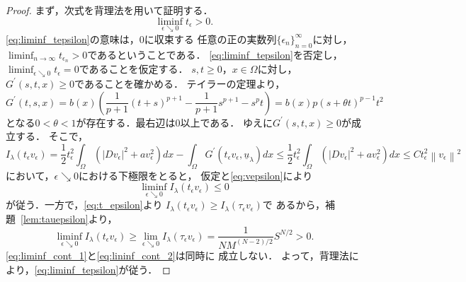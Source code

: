 \begin{proof}
 まず，次式を背理法を用いて証明する．
 \begin{equation}
  \liminf_{\epsilon \searrow 0} t_\epsilon > 0. \label{eq:liminf_tepsilon}
 \end{equation}
 \eqref{eq:liminf_tepsilon}の意味は，$0$に収束する
 任意の正の実数列$\{ \epsilon_n \}_{n=0}^\infty$に対し，
 $\liminf_{n \to \infty} t_{\epsilon_n} > 0$であるということである．
 \eqref{eq:liminf_tepsilon}を否定し，
 $\liminf_{\epsilon \searrow 0} t_\epsilon = 0$であることを仮定する．
 $s, t \geq 0$，$x \in \Omega$に対し，
 $G^\prime(s, t, x) \geq 0$であることを確かめる．
 テイラーの定理より，
 \[
  G^\prime(t, s, x) = b(x) \left( \frac{1}{p+1}(t+s)^{p+1} -
 \frac{1}{p+1}s^{p+1} - s^p t \right)
 = b(x) p (s + \theta t)^{p-1} t^2
 \]
 となる$0 < \theta < 1$が存在する．最右辺は$0$以上である．
 ゆえに$G^\prime(s, t, x) \geq 0$が成立する．
 そこで，
 \begin{equation}
  I_\lambda(t_\epsilon v_\epsilon) = \frac{1}{2} t_\epsilon^2 
   \int_\Omega \left( \lvert Dv_\epsilon \rvert^2 +  a v_\epsilon^2
               \right) dx
  - \int_\Omega G^\prime(t_\epsilon v_\epsilon, \underline{u}_\lambda) dx \leq
  \frac{1}{2} t_\epsilon^2 
  \int_\Omega \left( \lvert Dv_\epsilon \rvert^2 + a v_\epsilon^2
              \right) dx \leq  C t_\epsilon^2 \left\|
              v_\epsilon \right\|^2 
 \end{equation}
 において，$\epsilon \searrow 0$における下極限をとると，
 仮定と\eqref{eq:vepsilon}により
 \begin{equation}
  \liminf_{\epsilon \searrow 0} I_\lambda (t_\epsilon v_\epsilon) \leq
   0 \label{eq:liminf_cont_1}
 \end{equation}
 が従う．一方で，\eqref{eq:t_epsilon}より
 $I_\lambda(t_\epsilon v_\epsilon) \geq I_\lambda
 (\tau_\epsilon v_\epsilon)$で
 あるから，補題~\ref{lem:tauepsilon}より，
 \begin{equation}
  \liminf_{\epsilon \searrow 0} I_\lambda(t_\epsilon v_\epsilon) \geq
   \lim_{\epsilon \searrow 0} I_\lambda (\tau_\epsilon v_\epsilon) =
   \frac{1}{NM^{(N-2)/2}} S^{N/2} > 0. \label{eq:lininf_cont_2}
 \end{equation}
 \eqref{eq:liminf_cont_1}と\eqref{eq:lininf_cont_2}は同時に
 成立しない．
 よって，背理法により，\eqref{eq:liminf_tepsilon}が従う． 


\end{proof}
